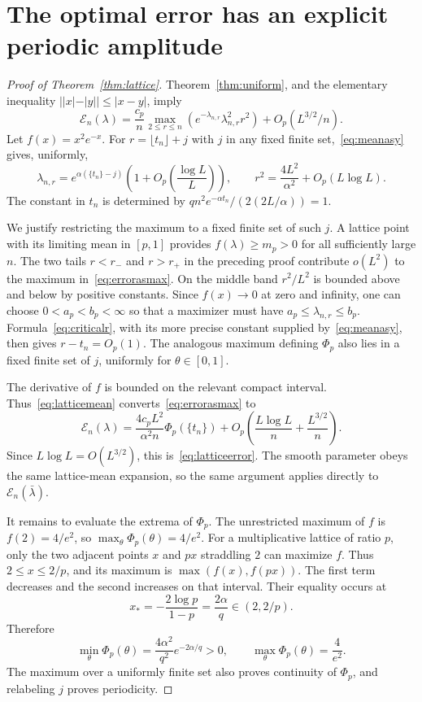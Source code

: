 \documentclass[11pt]{article}
\theoremstyle{definition}\newtheorem{definition}[theorem]{Definition}
\theoremstyle{remark}\newtheorem{remark}[theorem]{Remark}
\newcommand{\la}{\lambda}
\begin{document}
\section{The optimal error has an explicit periodic amplitude}\label{sec:lattice}
\begin{proof}[Proof of Theorem~\ref{thm:lattice}]
Theorem~\ref{thm:uniform}, and the elementary inequality
$||x|-|y||\le|x-y|$, imply
\begin{equation}
 \mathcal E_n(\la)=\frac{c_p}{n}
       \max_{2\le r\le n}\left(e^{-\la_{n,r}}\la_{n,r}^2r^2\right)
             +O_p(L^{3/2}/n).\label{eq:errorasmax}
\end{equation}
Let $f(x)=x^2e^{-x}$. For $r=\lfloor t_n\rfloor+j$ with $j$ in any
fixed finite set,~\eqref{eq:meanasy} gives, uniformly,
\begin{equation}
 \la_{n,r}=e^{\alpha(\{t_n\}-j)}
       \left(1+O_p\left(\frac{\log L}{L}\right)\right),\qquad
 r^2=\frac{4L^2}{\alpha^2}+O_p(L\log L).\label{eq:latticemean}
\end{equation}
The constant in $t_n$ is determined by
$qn^2e^{-\alpha t_n}/(2(2L/\alpha))=1$.

We justify restricting the maximum to a fixed finite set of such $j$.
A lattice point with its limiting mean in $[p,1]$ provides
$f(\la)\ge m_p>0$ for all sufficiently large $n$. The two tails
$r<r_-$ and $r>r_+$ in the preceding proof contribute $o(L^2)$ to the
maximum in~\eqref{eq:errorasmax}. On the middle band $r^2/L^2$ is bounded
above and below by positive constants. Since $f(x)\to0$ at zero and
infinity, one can choose $0<a_p<b_p<\infty$ so that a maximizer must
have $a_p\le\la_{n,r}\le b_p$. Formula~\eqref{eq:criticalr}, with its
more precise constant supplied by~\eqref{eq:meanasy}, then gives
$r-t_n=O_p(1)$. The analogous maximum defining $\Phi_p$ also lies in a
fixed finite set of $j$, uniformly for $\theta\in[0,1]$.

The derivative of $f$ is bounded on the relevant compact interval.
Thus~\eqref{eq:latticemean} converts~\eqref{eq:errorasmax} to
\[
 \mathcal E_n(\la)=\frac{4c_pL^2}{\alpha^2n}\Phi_p(\{t_n\})
       +O_p\left(\frac{L\log L}{n}+\frac{L^{3/2}}n\right).
\]
Since $L\log L=O(L^{3/2})$, this is~\eqref{eq:latticeerror}.
The smooth parameter obeys the same lattice-mean expansion, so the same
argument applies directly to $\mathcal E_n(\bar\la)$.

It remains to evaluate the extrema of $\Phi_p$.
The unrestricted maximum of $f$ is $f(2)=4/e^2$, so
$\max_\theta\Phi_p(\theta)=4/e^2$.
For a multiplicative lattice of ratio $p$, only the two adjacent points
$x$ and $px$ straddling $2$ can maximize $f$. Thus $2\le x\le2/p$,
and its maximum is $\max(f(x),f(px))$.
The first term decreases and the second increases on that interval.
Their equality occurs at
\[
 x_*=-\frac{2\log p}{1-p}=\frac{2\alpha}{q}\in(2,2/p).
\]
Therefore
\begin{equation}
 \min_\theta\Phi_p(\theta)
       =\frac{4\alpha^2}{q^2}e^{-2\alpha/q}>0,
 \qquad \max_\theta\Phi_p(\theta)=\frac4{e^2}.
 \label{eq:Phiextrema}
\end{equation}
The maximum over a uniformly finite set also proves continuity of
$\Phi_p$, and relabeling $j$ proves periodicity.


\end{proof}
\end{document}
